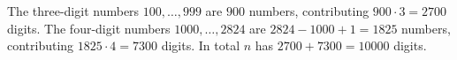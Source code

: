 The three-digit numbers $100,\dots,999$ are $900$ numbers, contributing $900\cdot3=2700$ digits. The four-digit numbers $1000,\dots,2824$ are $2824-1000+1=1825$ numbers, contributing $1825\cdot4=7300$ digits. In total $n$ has $2700+7300=\boxed{10000}$ digits.
